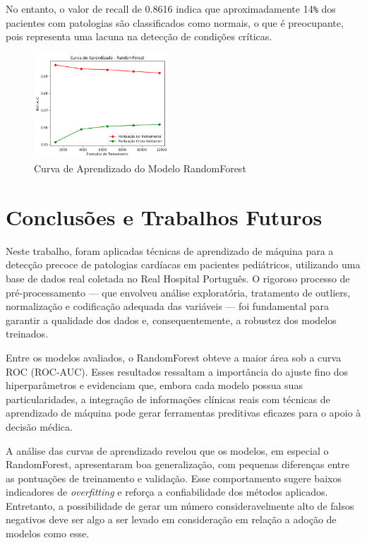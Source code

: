 \documentclass[conference]{IEEEtran}
\begin{document}
No entanto, o valor de recall de 0.8616 indica que aproximadamente 14\verb|%| dos pacientes com patologias são classificados como normais, o que é preocupante, pois representa uma lacuna na detecção de condições críticas.

\begin{figure}[ht]
    \centering
    \includegraphics[width=0.45\textwidth]{curva_aprendizado.png}
    \caption{Curva de Aprendizado do Modelo RandomForest}
    \label{fig:curva_aprendizado}
\end{figure}


\section{Conclusões e Trabalhos Futuros}
Neste trabalho, foram aplicadas técnicas de aprendizado de máquina para a detecção precoce de patologias cardíacas em pacientes pediátricos, utilizando uma base de dados real coletada no Real Hospital Português. O rigoroso processo de pré-processamento — que envolveu análise exploratória, tratamento de outliers, normalização e codificação adequada das variáveis — foi fundamental para garantir a qualidade dos dados e, consequentemente, a robustez dos modelos treinados.

Entre os modelos avaliados, o RandomForest obteve a maior área sob a curva ROC (ROC-AUC). Esses resultados ressaltam a importância do ajuste fino dos hiperparâmetros e evidenciam que, embora cada modelo possua suas particularidades, a integração de informações clínicas reais com técnicas de aprendizado de máquina pode gerar ferramentas preditivas eficazes para o apoio à decisão médica.

A análise das curvas de aprendizado revelou que os modelos, em especial o RandomForest, apresentaram boa generalização, com pequenas diferenças entre as pontuações de treinamento e validação. Esse comportamento sugere baixos indicadores de \emph{overfitting} e reforça a confiabilidade dos métodos aplicados. Entretanto, a possibilidade de gerar um número consideravelmente alto de falsos negativos deve ser algo a ser levado em consideração em relação a adoção de modelos como esse.
\end{document}
